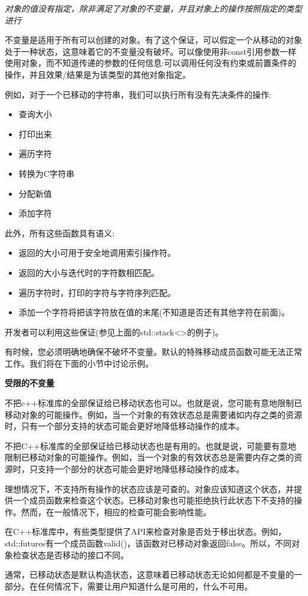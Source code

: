\textit{对象的值没有指定，除非满足了对象的不变量，并且对象上的操作按照指定的类型进行}\par

不变量是适用于所有可以创建的对象。有了这个保证，可以假定一个从移动的对象处于一种状态，这意味着它的不变量没有破坏。可以像使用非const引用参数一样使用对象，而不知道传递的参数的任何信息:可以调用任何没有约束或前置条件的操作，并且效果/结果是为该类型的其他对象指定。\par

例如，对于一个已移动的字符串，我们可以执行所有没有先决条件的操作:\par

\begin{itemize}
	\item 查询大小
	\item 打印出来
	\item 遍历字符
	\item 转换为C字符串
	\item 分配新值
	\item 添加字符
\end{itemize}

此外，所有这些函数具有语义:\par

\begin{itemize}
	\item 返回的大小可用于安全地调用索引操作符。
	\item 返回的大小与迭代时的字符数相匹配。
	\item 遍历字符时，打印的字符与字符序列匹配。
	\item 添加一个字符将把该字符放在值的末尾(不知道是否还有其他字符在前面)。
\end{itemize}

开发者可以利用这些保证(参见上面的std::stack<>的例子)。\par

有时候，您必须明确地确保不破坏不变量。默认的特殊移动成员函数可能无法正常工作。我们将在下面的小节中讨论示例。\par

\hspace*{\fill} \par %
\textbf{受限的不变量}

不把c++标准库的全部保证给已移动状态也可以。也就是说，您可能有意地限制已移动对象的可能操作。例如，当一个对象的有效状态总是需要诸如内存之类的资源时，只有一个部分支持的状态可能会更好地降低移动操作的成本。\par

不把C++标准库的全部保证给已移动状态也是有用的。也就是说，可能要有意地限制已移动对象的可能操作。例如，当一个对象的有效状态总是需要内存之类的资源时，只支持一个部分的状态可能会更好地降低移动操作的成本。\par

理想情况下，不支持所有操作的状态应该是可查的。对象应该知道这个状态，并提供一个成员函数来检查这个状态。已移动对象也可能拒绝执行此状态下不支持的操作。然而，在一般情况下，相应的检查可能会影响性能。\par

在C++标准库中，有些类型提供了API来检查对象是否处于移出状态。例如，std::futures有一个成员函数valid()，该函数对已移动对象返回false。所以，不同对象检查状态是否移动的接口不同。\par

通常，已移动状态是默认构造状态，这意味着已移动状态无论如何都是不变量的一部分。在任何情况下，需要让用户知道什么是可用的，什么不可用。\par




